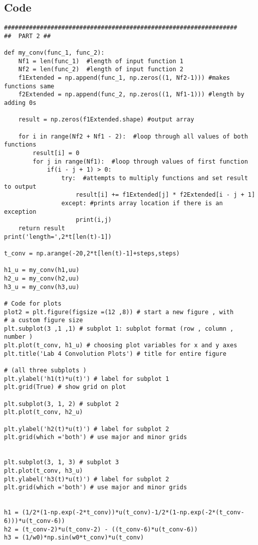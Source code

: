 \subsection*{Code}
\begin{scriptsize}
\begin{lstlisting}
#################################################################
##  PART 2 ##

def my_conv(func_1, func_2):
    Nf1 = len(func_1)  #length of input function 1
    Nf2 = len(func_2)  #length of input function 2
    f1Extended = np.append(func_1, np.zeros((1, Nf2-1))) #makes functions same
    f2Extended = np.append(func_2, np.zeros((1, Nf1-1))) #length by adding 0s   
        
    result = np.zeros(f1Extended.shape) #output array

    for i in range(Nf2 + Nf1 - 2):  #loop through all values of both functions
        result[i] = 0
        for j in range(Nf1):  #loop through values of first function
            if(i - j + 1) > 0:
                try:  #attempts to multiply functions and set result to output
                    result[i] += f1Extended[j] * f2Extended[i - j + 1]
                except: #prints array location if there is an exception
                    print(i,j)                    
    return result    
print('length=',2*t[len(t)-1])

t_conv = np.arange(-20,2*t[len(t)-1]+steps,steps)

h1_u = my_conv(h1,uu)
h2_u = my_conv(h2,uu)
h3_u = my_conv(h3,uu)

# Code for plots
plot2 = plt.figure(figsize =(12 ,8)) # start a new figure , with
# a custom figure size
plt.subplot(3 ,1 ,1) # subplot 1: subplot format (row , column , number )
plt.plot(t_conv, h1_u) # choosing plot variables for x and y axes
plt.title('Lab 4 Convolution Plots') # title for entire figure

# (all three subplots )
plt.ylabel('h1(t)*u(t)') # label for subplot 1
plt.grid(True) # show grid on plot

plt.subplot(3, 1, 2) # subplot 2
plt.plot(t_conv, h2_u)

plt.ylabel('h2(t)*u(t)') # label for subplot 2
plt.grid(which ='both') # use major and minor grids


plt.subplot(3, 1, 3) # subplot 3
plt.plot(t_conv, h3_u)
plt.ylabel('h3(t)*u(t)') # label for subplot 2
plt.grid(which ='both') # use major and minor grids


h1 = (1/2*(1-np.exp(-2*t_conv))*u(t_conv)-1/2*(1-np.exp(-2*(t_conv-6)))*u(t_conv-6))
h2 = (t_conv-2)*u(t_conv-2) - ((t_conv-6)*u(t_conv-6))
h3 = (1/w0)*np.sin(w0*t_conv)*u(t_conv)


\end{lstlisting}
\end{scriptsize}
